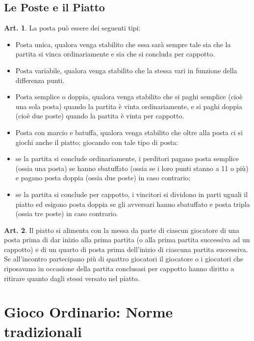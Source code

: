 \documentclass[italian,a4paper]{book}
\theoremstyle{definition}
\newtheorem{art}{Art.}
\newenvironment{packeditem}{
\begin{itemize}
  \setlength{\itemsep}{1pt}
  \setlength{\parskip}{0pt}
  \setlength{\parsep}{0pt}
}{\end{itemize}}
\begin{document}
\subsection{Le Poste e il Piatto}
\begin{art}
La posta può essere dei seguenti tipi:
\begin{packeditem}
\item   Posta unica, qualora venga stabilito che essa sarà sempre tale sia che la partita si vinca ordinariamente e sia che si concluda per cappotto.
\item Posta variabile, qualora venga stabilito che la stessa vari in funzione della differenza punti.
\item Posta semplice o doppia, qualora venga stabilito che si paghi semplice (cioè una sola posta) quando la partita è vinta ordinariamente, e si paghi doppia (cioè due poste) quando la partita è vinta per cappotto.
\item Posta con marcio e batuffa, qualora venga stabilito che oltre alla posta ci si giochi anche il piatto; giocando con tale tipo di posta:
\item   se la partita si conclude ordinariamente, i perditori pagano posta semplice (ossia una posta) se hanno sbatuffato (ossia se i loro punti stanno a 11 o più) e pagano posta doppia (ossia due poste) in caso contrario;
\item   se la partita si conclude per cappotto, i vincitori si dividono in parti uguali il piatto ed esigono posta doppia se gli avversari hanno sbatuffato e posta tripla (ossia tre poste) in caso contrario.
    \end{packeditem}
\end{art}
\begin{art}
Il piatto si alimenta con la messa da parte di ciascun giocatore di una posta prima di dar inizio alla prima partita (o alla prima partita successiva ad un cappotto) e di un quarto di posta prima dell'inizio di ciascuna partita successiva. Se all'incontro partecipano più di quattro giocatori il giocatore o i giocatori che riposavano in occasione della partita conclusasi per cappotto hanno diritto a ritirare quanto dagli stessi versato nel piatto.
\end{art}
\section{Gioco Ordinario: Norme tradizionali}
\end{document}
